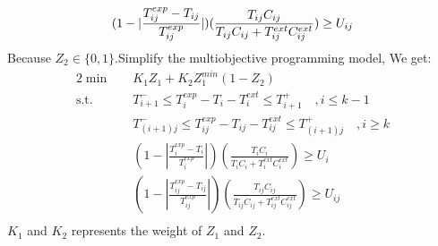 \documentclass[12pt,a4paper]{article}
\begin{document}
\begin{equation}
	(1-|\frac{T_{ij}^{exp}-T_{ij}}{T_{ij}^{exp}}|)(\frac{T_{ij}C_{ij}}{T_{ij}C_{ij}+T_{ij}^{ext}C_{ij}^{ext}})\geq U_{ij}\\
\end{equation}
Because $Z_2\in \{0,1\}$.Simplify the multiobjective programming model, We get:
\begin{alignat}{2}
\min \quad & K_1Z_1+K_2Z_1^{min}(1-Z_2)\\
\mbox{s.t.}\quad
& T_{i+1}^-\leq T_i^{exp}-T_i-T_i^{ext}\leq T_{i+1}^+ \quad ,i\leq k-1\\
& T_{(i+1)j}^-\leq T_{ij}^{exp}-T_{ij}-T_{ij}^{ext}\leq T_{(i+1)j}^+ \quad, i\geq k\\
& (1-|\frac{T_i^{exp}-T_i}{T_i^{exp}}|)(\frac{T_iC_i}{T_iC_i+T_i^{ext}C_i^{ext}})\geq U_i\\
& (1-|\frac{T_{ij}^{exp}-T_{ij}}{T_{ij}^{exp}}|)(\frac{T_{ij}C_{ij}}{T_{ij}C_{ij}+T_{ij}^{ext}C_{ij}^{ext}})\geq U_{ij}\\
\end{alignat}
$K_1$ and $K_2$ represents the weight of $Z_1$ and $Z_2$.
\end{document}
